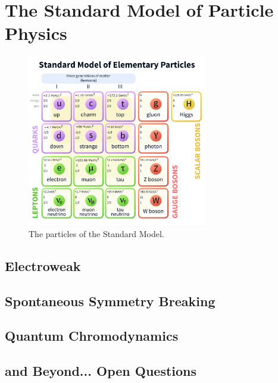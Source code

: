\chapter{The Standard Model of Particle Physics}
\label{chap:sm}

\begin{figure}[htbp]
\centering
\includegraphics[width=0.7\textwidth]{figs/StandardModelofElementaryParticles.pdf}
\caption{The particles of the Standard Model.}
\label{fig:sm}
\end{figure}

\section{Electroweak}
\section{Spontaneous Symmetry Breaking}
\section{Quantum Chromodynamics}
\section{and Beyond... Open Questions}
